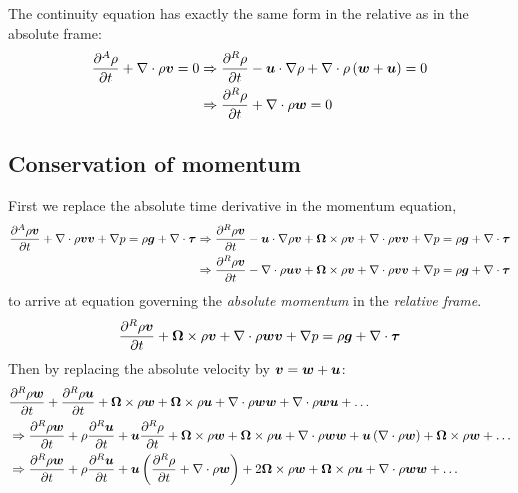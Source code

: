 The continuity equation has exactly the same form in the relative as
in the absolute frame:
\begin{align*}
  \ddtA{\dens} + \dive \dens \aVelV = 0 &\Rightarrow
  \ddtR{\dens} - 
  \fVelV \cdot \grad \dens + 
  \dive \dens \left(\rVelV + \fVelV\right) = 0 \\
  &\Rightarrow
  \ddtR{\dens} + 
  \dive \dens \rVelV = 0
\end{align*}

\subsection{Conservation of momentum}

First we replace the absolute time derivative in the momentum
equation,
\begin{align*}
  \ddtA{\dens \aVelV} + 
  \dive \dens \aVelV \aVelV +  
  \grad p = 
  \dens \gravV + \dive \shearStressT 
  &\Rightarrow
  \ddtR{\dens \aVelV} - 
  \fVelV \cdot \grad \dens \aVelV + 
  \rotV \times \dens \aVelV + 
  \dive \dens \aVelV \aVelV +  
  \grad p = 
  \dens \gravV + \dive \shearStressT \\
  &\Rightarrow
  \ddtR{\dens \aVelV} - 
  \dive \dens \fVelV \aVelV + 
  \rotV \times \dens \aVelV + 
  \dive \dens \aVelV \aVelV +  
  \grad p = 
  \dens \gravV + \dive \shearStressT
\end{align*}
to arrive at equation governing the \emph{absolute momentum} in the
\emph{relative frame}. 
\begin{equation}
  \ddtR{\dens \aVelV} + 
  \rotV \times \dens \aVelV + 
  \dive \dens \rVelV \aVelV + 
  \grad p = 
  \dens \gravV + \dive \shearStressT
  \label{eq:relativeAbsoluteMomentum}
\end{equation}
Then by replacing the absolute velocity by $\aVelV = \rVelV + \fVelV$:
\begin{align*}
  &\ddtR{\dens \rVelV} + 
  \ddtR{\dens \fVelV} + 
  \rotV \times \dens \rVelV + 
  \rotV \times \dens \fVelV + 
  \dive \dens \rVelV \rVelV + 
  \dive \dens \rVelV \fVelV + \ldots \\
  &\Rightarrow \ddtR{\dens \rVelV} + 
  \dens \ddtR{\fVelV} + 
  \fVelV \ddtR{\dens} + 
  \rotV \times \dens \rVelV + 
  \rotV \times \dens \fVelV + 
  \dive \dens \rVelV \rVelV + 
  \fVelV \left(\dive \dens \rVelV\right) + \rotV \times \dens \rVelV + \ldots \\
  &\Rightarrow \ddtR{\dens \rVelV} + 
  \dens \ddtR{\fVelV} + 
  \fVelV \left(\ddtR{\dens} + \dive \dens \rVelV\right) +
  2 \rotV \times \dens \rVelV +
  \rotV \times \dens \fVelV + 
  \dive \dens \rVelV \rVelV + \ldots 
\end{align*}
